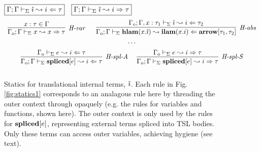\begin{figure}[t]
$\fbox{$\Gamma; \Gamma \vdash_\Sigma \hat{\imath} \leadsto i \Leftarrow \tau$}$~
$\fbox{$\Gamma; \Gamma \vdash_\Sigma \hat{\imath} \leadsto i \Rightarrow \tau$}$
\[
\begin{array}{c}
\infer[\textit{H-var}]
	{\Gout; \Gin \vdash_\Sigma x \leadsto x \Rightarrow\tau } 
	{x:\tau \in \Gin }
~~~~~
\infer[\textit{H-abs}]
	{\Gout; \Gin \vdash_\Sigma  \keyw{hlam}(x . \ih) \leadsto \keyw{ilam}(x.i) \Leftarrow \keyw{arrow}[\tau_1,  \tau_2] } 
	{\Gout; \Gin, x:\tau_1 \vdash_\Sigma \hat{\imath}\leadsto i\Leftarrow \tau_2 }\\[1ex]
\cdots\\[1ex]
\infer[\textit{H-spl-A}]
	{\Gout; \Gin \vdash_\Sigma \keyw{spliced}[e] \leadsto i \Leftarrow \tau}
	{\Gout \vdash_\Sigma e \leadsto i \Leftarrow \tau}~~~~

\infer[\textit{H-spl-S}]
	{\Gout; \Gin \vdash_\Sigma \keyw{spliced}[e] \leadsto i \Rightarrow \tau}
	{\Gout \vdash_\Sigma e \leadsto i \Rightarrow \tau}\\[2ex]
\end{array}
\]
\vspace{-15px}
\caption{Statics for translational internal terms, $\hat{\imath}$. Each rule in Fig. \ref{fig:statics1} corresponds to an analagous rule here by threading the outer context through opaquely (e.g. the rules for variables and functions, shown here). The outer context is only used by the rules for $\textbf{spliced}[e]$, representing external terms spliced into TSL bodies. Only these terms can access outer variables, achieving hygiene (see text).}
\vspace{-10px}
\label{fig:staticsHat}
\end{figure}
